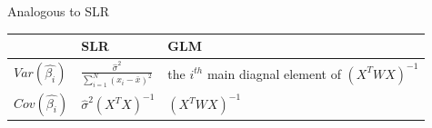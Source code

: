 \documentclass[ignorenonframetext,]{beamer}
\begin{document}
\begin{frame}{Analogous to SLR}

\begin{longtable}[]{@{}lll@{}}
\toprule
\begin{minipage}[b]{0.16\columnwidth}\raggedright\strut
~\strut
\end{minipage} & \begin{minipage}[b]{0.16\columnwidth}\raggedright\strut
SLR\strut
\end{minipage} & \begin{minipage}[b]{0.41\columnwidth}\raggedright\strut
GLM\strut
\end{minipage}\tabularnewline
\midrule
\endhead
\begin{minipage}[t]{0.16\columnwidth}\raggedright\strut
\(Var(\hat{\beta_i})\)\strut
\end{minipage} & \begin{minipage}[t]{0.16\columnwidth}\raggedright\strut
\(\frac{\hat{\sigma}^2}{\sum_{i=1}^N(x_i-\bar{x})^2}\)\strut
\end{minipage} & \begin{minipage}[t]{0.41\columnwidth}\raggedright\strut
the \(i^{th}\) main diagnal element of \((X^TWX)^{-1}\)\strut
\end{minipage}\tabularnewline
\begin{minipage}[t]{0.16\columnwidth}\raggedright\strut
\(Cov(\hat{\beta_i})\)\strut
\end{minipage} & \begin{minipage}[t]{0.16\columnwidth}\raggedright\strut
\(\hat{\sigma}^2(X^TX)^{-1}\)\strut
\end{minipage} & \begin{minipage}[t]{0.41\columnwidth}\raggedright\strut
\((X^TWX)^{-1}\)\strut
\end{minipage}\tabularnewline
\bottomrule
\end{longtable}

\end{frame}
\end{document}
